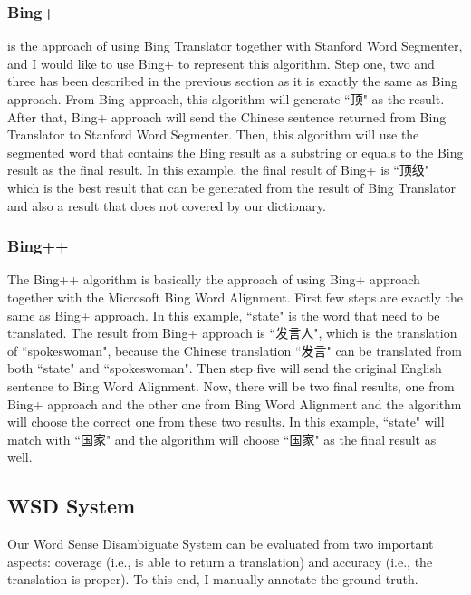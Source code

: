 \begin{CJK}{UTF8}{gbsn}
\subsubsection{Bing+}
 is the approach of using Bing Translator together with Stanford Word Segmenter, and I would like to use Bing+ to represent this algorithm. Step one, two and three has been described in the previous section as it is exactly the same as Bing approach. From Bing approach, this algorithm will generate ``顶" as the result. After that, Bing+ approach will send the Chinese sentence returned from Bing Translator to Stanford Word Segmenter. Then, this algorithm will use the segmented word that contains the Bing result as a substring or equals to the Bing result as the final result. In this example, the final result of Bing+ is ``顶级" which is the best result that can be generated from the result of Bing Translator and also a result that does not covered by our dictionary.

\subsubsection{Bing++}
The Bing++ algorithm is basically the approach of using Bing+ approach together with the Microsoft Bing Word Alignment. First few steps are exactly the same as Bing+ approach. In this example, ``state" is the word that need to be translated. The result from Bing+ approach is ``发言人", which is the translation of ``spokeswoman", because the Chinese translation ``发言" can be translated from both ``state" and ``spokeswoman". Then step five will send the original English sentence to Bing Word Alignment. Now, there will be two final results, one from Bing+ approach and the other one from Bing Word Alignment and the algorithm will choose the correct one from these two results. In this example, ``state" will match with ``国家" and the algorithm will choose ``国家" as the final result as well.

\subsection{WSD System}
Our Word Sense Disambiguate System can be evaluated from two important aspects: coverage (i.e., is able to return a translation) and accuracy (i.e., the translation is proper). To this end, I manually annotate the ground truth.


\end{CJK}
